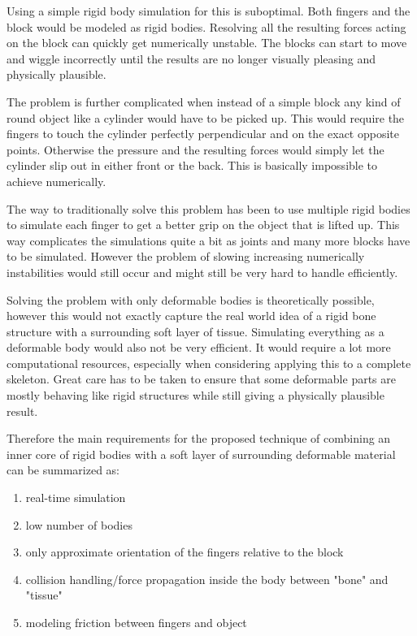 Using a simple rigid body simulation for this is suboptimal. Both fingers and the block would be modeled as rigid bodies. Resolving all the resulting forces acting on the block can quickly get numerically unstable. The blocks can start to move and wiggle incorrectly until the results are no longer visually pleasing and physically plausible.

The problem is further complicated when instead of a simple block any kind of round object like a cylinder would have to be picked up. This would require the fingers to touch the cylinder perfectly perpendicular and on the exact opposite points. Otherwise the pressure and the resulting forces would simply let the cylinder slip out in either front or the back. This is basically impossible to achieve numerically.

The way to traditionally solve this problem has been to use multiple rigid bodies to simulate  each finger to get a better grip on the object that is lifted up. This way complicates the simulations quite a bit as joints and many more blocks have to be simulated. However the problem of slowing increasing numerically instabilities would still occur and might still be very hard to handle efficiently.

Solving the problem with only deformable bodies is theoretically possible, however this would not exactly capture the real world idea of a rigid bone structure with a surrounding soft layer of tissue. Simulating everything as a deformable body would also not be very efficient. It would require a lot more computational resources, especially when considering applying this to a complete skeleton. Great care has to be taken to ensure that some deformable parts are mostly behaving like rigid structures while still giving a physically plausible result.

Therefore the main requirements for the proposed technique of combining an inner core of rigid bodies with a soft layer of surrounding deformable material can be summarized as:

\begin{enumerate}
\item real-time simulation
\item	low number of bodies
\item only approximate orientation of the fingers relative to the block
\item collision handling/force propagation inside the body between "bone" and "tissue"
\item modeling friction between fingers and object
\end{enumerate}